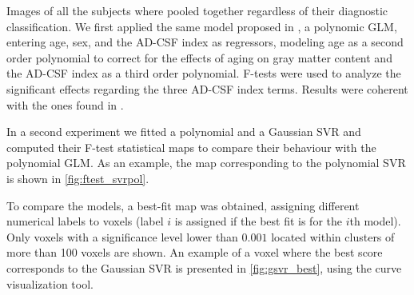 \documentclass{article}
\begin{document}
Images of all the subjects where pooled together regardless of their diagnostic classification. We first applied the same model proposed in \cite{Nonlinear_Gispert_2015}, a polynomic GLM, entering age, sex, and the AD-CSF index as regressors, modeling age as a second order polynomial to correct for the effects of aging on gray matter content and the AD-CSF index as a third order polynomial. F-tests were used to analyze the significant effects regarding the three AD-CSF index terms. Results were coherent with the ones found in \cite{Nonlinear_Gispert_2015}.

In a second experiment we fitted a polynomial and a Gaussian SVR and computed their F-test statistical maps to compare their behaviour with the polynomial GLM. As an example, the map corresponding to the polynomial SVR is shown in \autoref{fig:ftest_svrpol}.

To compare the models, a best-fit map was obtained, assigning different numerical labels to voxels (label $i$ is assigned if the best fit is for the $i$th model).  Only voxels with a significance level lower than $0.001$ located within clusters of more than 100 voxels are shown. An example of a voxel where the best score corresponds to the Gaussian SVR is presented in \autoref{fig:gsvr_best}, using the curve visualization tool.
\end{document}
